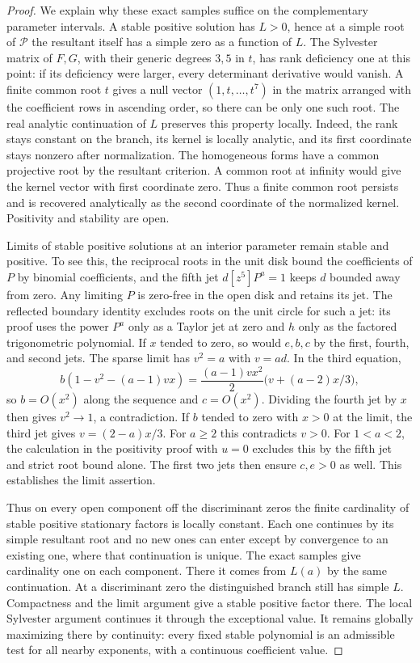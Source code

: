\documentclass[11pt]{article}
\begin{document}
\begin{proof}
We explain why these exact samples suffice on the complementary
parameter intervals. A stable positive solution has \(L>0\),
hence at a simple root of \(\mathcal P\) the resultant itself has a
simple zero as a function of \(L\). The Sylvester matrix of
\(F,G\), with their generic degrees \(3,5\) in \(t\), has
rank deficiency one at this point: if its deficiency were
larger, every determinant derivative would vanish. A finite
common root \(t\) gives a null vector
\((1,t,\ldots,t^7)\) in the matrix arranged with the
coefficient rows in ascending order, so there can be only
one such root. The real analytic continuation of \(L\) preserves
this property locally. Indeed, the rank stays constant on
the branch, its kernel is locally analytic, and its first
coordinate stays nonzero after normalization. The homogeneous
forms have a common projective root by the resultant criterion.
A common root at infinity would give the kernel vector with
first coordinate zero. Thus a finite common root persists
and is recovered analytically as the second coordinate of
the normalized kernel. Positivity and stability are open.

Limits of stable positive solutions at an interior parameter
remain stable and positive. To see this, the reciprocal roots
in the unit disk bound the coefficients of \(P\) by binomial
coefficients, and the fifth jet \(d[z^5]P^a=1\) keeps \(d\)
bounded away from zero. Any limiting \(P\) is zero-free in the
open disk and retains its jet. The reflected boundary
identity excludes roots on the unit circle for such a jet:
its proof uses the power \(P^a\) only as a Taylor jet at zero
and \(h\) only as the factored trigonometric polynomial.
If \(x\) tended to zero, so would \(e,b,c\) by the first,
fourth, and second jets. The sparse limit has \(v^2=a\) with
\(v=ad\). In the third equation,
\[
 b(1-v^2-(a-1)vx)
   =\frac{(a-1)vx^2}{2}\bigl(v+(a-2)x/3\bigr),
\]
so \(b=O(x^2)\) along the sequence and \(c=O(x^2)\).
Dividing the fourth jet by \(x\) then gives \(v^2\to1\),
a contradiction. If \(b\) tended to zero with \(x>0\) at
the limit, the third jet gives \(v=(2-a)x/3\). For \(a\ge2\)
this contradicts \(v>0\). For \(1<a<2\), the calculation in
the positivity proof with \(u=0\) excludes this by the fifth
jet and strict root bound alone. The first two jets then
ensure \(c,e>0\) as well. This establishes the limit assertion.

Thus on every open component off the discriminant zeros
the finite cardinality of stable positive stationary factors
is locally constant. Each one continues by its simple
resultant root and no new ones can enter except by convergence
to an existing one, where that continuation is unique.
The exact samples give cardinality one on each component.
There it comes from \(L(a)\) by the same continuation.
At a discriminant zero the distinguished branch still has
simple \(L\). Compactness and the limit argument give a stable
positive factor there. The local Sylvester argument continues
it through the exceptional value. It remains globally maximizing
there by continuity: every fixed stable polynomial is an
admissible test for all nearby exponents, with a continuous
coefficient value.


\end{proof}
\end{document}
